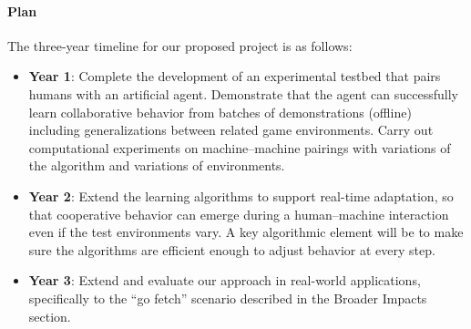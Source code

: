 
\vspace{\up}
\paragraph{Plan}

The three-year timeline for our proposed project is as follows:

\begin{itemize}
\item {\bf Year 1}: Complete the development of an experimental
  testbed that pairs humans with an artificial agent.  Demonstrate
  that the agent can successfully learn collaborative behavior from
  batches of demonstrations (offline) including generalizations
  between related game environments. Carry out computational
  experiments on machine--machine pairings with variations of the
  algorithm and variations of environments.

\item {\bf Year 2}: Extend the learning algorithms to support
  real-time adaptation, so that cooperative behavior can emerge during
  a human--machine interaction even if the test environments vary. A
  key algorithmic element will be to make sure the algorithms are
  efficient enough to adjust behavior at every step.

\item {\bf Year 3}: Extend and evaluate our approach in real-world
  applications, specifically to the ``go fetch'' scenario described in
  the Broader Impacts section. %

\end{itemize}


 

